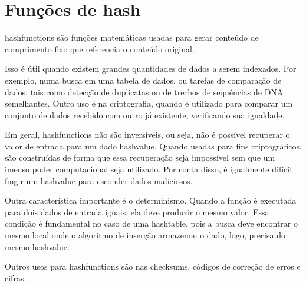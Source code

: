 
\section{Funções de hash}
\label{sec:sha1}

\Glspl{hashfunction} são funções matemáticas usadas para gerar conteúdo de comprimento
fixo que referencia o conteúdo original.

Isso é útil quando existem grandes quantidades de dados a serem indexados. Por exemplo,
numa busca em uma tabela de dados, ou tarefas de comparação de dados, tais como
detecção de duplicatas ou de trechos de sequências de DNA semelhantes. Outro uso é na
criptografia, quando é utilizado para comparar um conjunto de dados recebido com outro
já existente, verificando sua igualdade.

Em geral, \glspl*{hashfunction} não são inversíveis, ou seja, não é possível recuperar o
valor de entrada para um dado \gls{hashvalue}. Quando usadas para fins criptográficos,
são construídas de forma que essa recuperação seja impossível sem que um imenso poder
computacional seja utilizado. Por conta disso, é igualmente difícil fingir um
\gls*{hashvalue} para esconder dados maliciosos.

Outra característica importante é o determinismo. Quando a função é executada para dois
dados de entrada iguais, ela deve produzir o mesmo valor. Essa condição é fundamental
no caso de uma \gls*{hashtable}, pois a busca deve encontrar o mesmo local onde o
algoritmo de inserção armazenou o dado, logo, precisa do mesmo \gls*{hashvalue}.

Outros usos para \glspl*{hashfunction} são nas \glspl{checksum}, códigos de correção de
erros e cifras.

